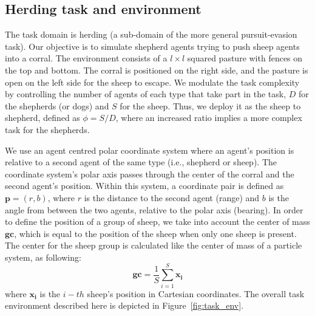 \documentclass[conference]{IEEEtran}
\begin{document}
\subsection{Herding task and environment}
\label{sec:herding_task_environment}
The task domain is herding (a sub-domain of the more general pursuit-evasion task).
Our objective is to simulate shepherd agents trying to push sheep agents into a corral. 
The environment consists of a $l \times l$ squared pasture with fences on the top and bottom.
The corral is positioned on the right side, and the pasture is open on the left side for the sheep to escape.
We modulate the task complexity by controlling the number of agents of each type that take part in the task, $D$ for the shepherds (or dogs) and $S$ for the sheep.
Thus, we deploy it as the sheep to shepherd, defined as $\phi = S / D$, where an increased ratio implies a more complex task for the shepherds.

We use an agent centred polar coordinate system where an agent's position is relative to a second agent of the same type (i.e., shepherd or sheep).
The coordinate system's polar axis passes through the center of the corral and the second agent's position. 
Within this system, a coordinate pair is defined as $\mathbf{p} = (r, b)$, where $r$ is the distance to the second agent (range) and $b$ is the angle from between the two agents, relative to the polar axis (bearing).
In order to define the position of a group of sheep, we take into account the center of mass $\mathbf{gc}$, which is equal to the position of the sheep when only one sheep is present.
The center for the sheep group is calculated like the center of mass of a particle system, as following:
\begin{equation} \label{eq:gc}
\mathbf{gc} = \frac{1}{S} \sum_{i=1}^{S}{\mathbf{x_i}}
\end{equation}
where $\mathbf{x_i}$ is the $i-th$ sheep's position in Cartesian coordinates.
The overall task environment described here is depicted in Figure~\ref{fig:task_env}. 
\end{document}
